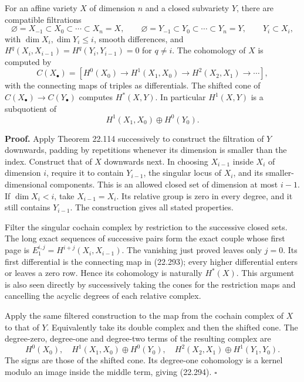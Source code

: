 \documentclass[
  11pt,
  a4paper,
]{article}
\begin{document}
For an affine variety \(X\) of dimension \(n\) and a closed subvariety
\(Y\), there are compatible filtrations \[
 \varnothing=X_{-1}\subset X_0\subset\cdots\subset X_n=X,
 \qquad
 \varnothing=Y_{-1}\subset Y_0\subset\cdots\subset Y_n=Y,
 \qquad Y_i\subset X_i,
 \tag{22.292}
\] with \(\dim X_i,\dim Y_i\le i\), smooth differences, and
\(H^q(X_i,X_{i-1})=H^q(Y_i,Y_{i-1})=0\) for \(q\ne i\). The cohomology
of \(X\) is computed by \[
 C(X_\bullet)=
 [H^0(X_0)\longrightarrow H^1(X_1,X_0)
   \longrightarrow H^2(X_2,X_1)\longrightarrow\cdots],
 \tag{22.293}
\] with the connecting maps of triples as differentials. The shifted
cone of \(C(X_\bullet)\to C(Y_\bullet)\) computes \(H^*(X,Y)\). In
particular \(H^1(X,Y)\) is a subquotient of \[
 H^1(X_1,X_0)\oplus H^0(Y_0).
 \tag{22.294}
\]

\textbf{Proof.} Apply Theorem 22.114 successively to construct the
filtration of \(Y\) downwards, padding by repetitions whenever its
dimension is smaller than the index. Construct that of \(X\) downwards
next. In choosing \(X_{i-1}\) inside \(X_i\) of dimension \(i\), require
it to contain \(Y_{i-1}\), the singular locus of \(X_i\), and its
smaller-dimensional components. This is an allowed closed set of
dimension at most \(i-1\). If \(\dim X_i<i\), take \(X_{i-1}=X_i\). Its
relative group is zero in every degree, and it still contains
\(Y_{i-1}\). The construction gives all stated properties.

Filter the singular cochain complex by restriction to the successive
closed sets. The long exact sequences of successive pairs form the exact
couple whose first page is \(E_1^{i,j}=H^{i+j}(X_i,X_{i-1})\). The
vanishing just proved leaves only \(j=0\). Its first differential is the
connecting map in (22.293); every higher differential enters or leaves a
zero row. Hence its cohomology is naturally \(H^*(X)\). This argument is
also seen directly by successively taking the cones for the restriction
maps and cancelling the acyclic degrees of each relative complex.

Apply the same filtered construction to the map from the cochain complex
of \(X\) to that of \(Y\). Equivalently take its double complex and then
the shifted cone. The degree-zero, degree-one and degree-two terms of
the resulting complex are \[
 H^0(X_0),\quad
 H^1(X_1,X_0)\oplus H^0(Y_0),\quad
 H^2(X_2,X_1)\oplus H^1(Y_1,Y_0).
 \tag{22.295}
\] The signs are those of the shifted cone. Its degree-one cohomology is
a kernel modulo an image inside the middle term, giving (22.294).
\(\square\)
\end{document}
